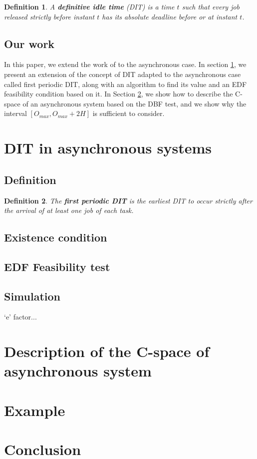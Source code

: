 \documentclass[times, 10pt,twocolumn, a4paper]{article}
\newtheorem{definition}{Definition}
\begin{document}
\begin{definition}
A \textbf{definitive idle time} (DIT) is a time $t$ such that every job released strictly before instant $t$ has its absolute deadline before or at instant $t$.\\
\end{definition}

  \subsection{Our work}

  In this paper, we extend the work of \cite{george2009characterization} to the asynchronous case. In section \ref{sct:asyncDIT}, we present an extension of the concept of DIT adapted to the asynchronous case called first periodic DIT, along with an algorithm to find its value and an EDF feasibility condition based on it. In Section \ref{sct:asyncCspace}, we show how to describe the C-space of an asynchronous system based on the DBF test, and we show why the interval $[O_{max}, O_{max} + 2 H]$ is sufficient to consider.

\section{DIT in asynchronous systems}
  \label{sct:asyncDIT}

  \subsection{Definition}

  \begin{definition}
  The \textbf{first periodic DIT} is the earliest DIT to occur strictly after the arrival of at least one job of each task.
  \end{definition}


  \subsection{Existence condition}

  \subsection{EDF Feasibility test}

  \subsection{Simulation}

  `e' factor...

\section{Description of the C-space of asynchronous system}
  \label{sct:asyncCspace}

\section{Example}

\section{Conclusion}



\end{document}
